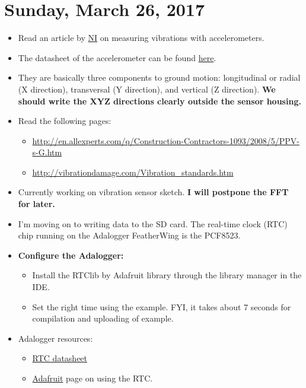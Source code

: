 \documentclass[12pt]{article}
\begin{document}
\section{Sunday, March 26, 2017}
\begin{itemize}
\item Read an article by \href{http://www.ni.com/white-paper/3807/en/}{NI} on measuring vibrations with accelerometers.
\item The datasheet of the accelerometer can be found \href{https://cdn-shop.adafruit.com/datasheets/LSM303DLHC.PDF}{here}.
\item They are basically three components to ground motion: longitudinal or radial (X direction), transversal (Y direction), and vertical (Z direction). \textbf{We should write the XYZ directions clearly outside the sensor housing.}
\item Read the following pages:
	\begin{itemize}
	\item \url{http://en.allexperts.com/q/Construction-Contractors-1093/2008/5/PPV-s-G.htm}
	\item \url{http://vibrationdamage.com/Vibration_standards.htm}
	\end{itemize}
\item Currently working on vibration sensor sketch. \textbf{I will postpone the FFT for later.}	
\item I'm moving on to writing data to the SD card. The real-time clock (RTC) chip running on the Adalogger FeatherWing is the PCF8523.
\item \textbf{Configure the Adalogger:}
	\begin{itemize}
	\item Install the RTClib by Adafruit library through the library manager in the IDE.
	\item Set the right time using the example. FYI, it takes about 7 seconds for compilation and uploading of example.
	\end{itemize}
	
\item Adalogger resources:
	\begin{itemize}
	\item \href{http://www.nxp.com/documents/data_sheet/PCF8523.pdf}{RTC datasheet}
	\item \href{https://learn.adafruit.com/adafruit-adalogger-featherwing/using-the-real-time-clock}{Adafruit} page on using the RTC.
	\end{itemize}

\end{itemize}
\end{document}
